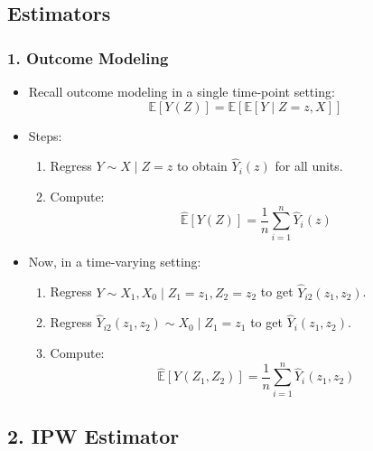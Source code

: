 \subsection*{Estimators}

\subsubsection*{1. Outcome Modeling}

\begin{itemize}
    \item Recall outcome modeling in a single time-point setting:
    \[
    \mathbb{E}[Y(Z)] = \mathbb{E}[\mathbb{E}[Y \mid Z = z, X]]
    \]

    \item Steps:
    \begin{enumerate}
        \item Regress $Y \sim X \mid Z = z$ to obtain $\hat{Y}_i(z)$ for all units.
        \item Compute:
        \[
        \widehat{\mathbb{E}}[Y(Z)] = \frac{1}{n} \sum_{i=1}^n \hat{Y}_i(z)
        \]
    \end{enumerate}
    
    \item Now, in a time-varying setting:
    \begin{enumerate}
        \item Regress $Y \sim X_1, X_0 \mid Z_1 = z_1, Z_2 = z_2$ to get $\hat{Y}_{i2}(z_1, z_2)$.
        \item Regress $\hat{Y}_{i2}(z_1, z_2) \sim X_0 \mid Z_1 = z_1$ to get $\hat{Y}_i(z_1, z_2)$.
        \item Compute:
        \[
        \widehat{\mathbb{E}}[Y(Z_1, Z_2)] = \frac{1}{n} \sum_{i=1}^n \hat{Y}_i(z_1, z_2)
        \]
    \end{enumerate}
\end{itemize}

\subsection*{2. IPW Estimator}

